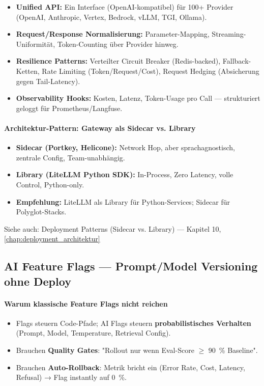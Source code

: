 \begin{itemize}
    \item \textbf{Unified API:} Ein Interface (OpenAI-kompatibel) für 100+ Provider (OpenAI, Anthropic, Vertex, Bedrock, vLLM, TGI, Ollama).
    \item \textbf{Request/Response Normalisierung:} Parameter-Mapping, Streaming-Uniformität, Token-Counting über Provider hinweg.
    \item \textbf{Resilience Patterns:} Verteilter Circuit Breaker (Redis-backed), Fallback-Ketten, Rate Limiting (Token/Request/Cost), Request Hedging (Absicherung gegen Tail-Latency).
    \item \textbf{Observability Hooks:} Kosten, Latenz, Token-Usage pro Call — strukturiert geloggt für Prometheus/Langfuse.
\end{itemize}

\paragraph{Architektur-Pattern: Gateway als Sidecar vs. Library}
\begin{itemize}
    \item \textbf{Sidecar (Portkey, Helicone):} Network Hop, aber sprachagnostisch, zentrale Config, Team-unabhängig.
    \item \textbf{Library (LiteLLM Python SDK):} In-Process, Zero Latency, volle Control, Python-only.
    \item \textbf{Empfehlung:} LiteLLM als Library für Python-Services; Sidecar für Polyglot-Stacks.
\end{itemize}

Siehe auch: Deployment Patterns (Sidecar vs. Library) — Kapitel 10, \ref{chap:deployment_architektur}


\subsection{AI Feature Flags — Prompt/Model Versioning ohne Deploy}

\paragraph{Warum klassische Feature Flags nicht reichen}
\begin{itemize}
    \item Flags steuern Code-Pfade; AI Flags steuern \textbf{probabilistisches Verhalten} (Prompt, Model, Temperature, Retrieval Config).
    \item Brauchen \textbf{Quality Gates}: "Rollout nur wenn Eval-Score $\ge$ 90~\% Baseline".
    \item Brauchen \textbf{Auto-Rollback}: Metrik bricht ein (Error Rate, Cost, Latency, Refusal) → Flag instantly auf 0~\%.
\end{itemize}

